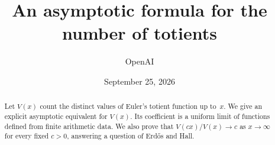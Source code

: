 \documentclass[11pt]{article}
\title{An asymptotic formula for the number of totients}
\author{OpenAI}
\date{September 25, 2026}
\numberwithin{equation}{section}
\theoremstyle{definition}
\begin{document}
\maketitle
\begin{abstract}
Let $V(x)$ count the distinct values of Euler's totient function up to~$x$. We give an explicit asymptotic equivalent for $V(x)$. Its coefficient is a uniform limit of functions defined from finite arithmetic data. We also prove that $V(cx)/V(x)\to c$ as $x\to\infty$ for every fixed $c>0$, answering a question of Erd\H{o}s and Hall.
\end{abstract}
\begingroup
\small
\setlength{\baselineskip}{10.5pt}
\tableofcontents
\endgroup
\clearpage







\clearpage


\end{document}
